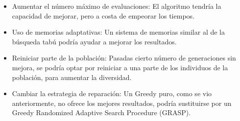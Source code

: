 	\begin{itemize}
		\item Aumentar el número máximo de evaluaciones: El algoritmo tendría la capacidad de mejorar, pero a costa de empeorar los tiempos.
		\item Uso de memorias adaptativas: Un sistema de memorias similar al de la búsqueda tabú podría ayudar a mejorar los resultados.
		\item Reiniciar parte de la población: Pasadas cierto número de generaciones sin mejora, se podría optar por reiniciar a una parte de los individuos de la población, para aumentar la diversidad.
		\item Cambiar la estrategia de reparación: Un Greedy puro, como se vio anteriormente, no ofrece los mejores resultados, podría sustituirse por un Greedy Randomized Adaptive Search Procedure (GRASP).
		
	\end{itemize} 
	
	
	

	
	\paragraph{} 
	
